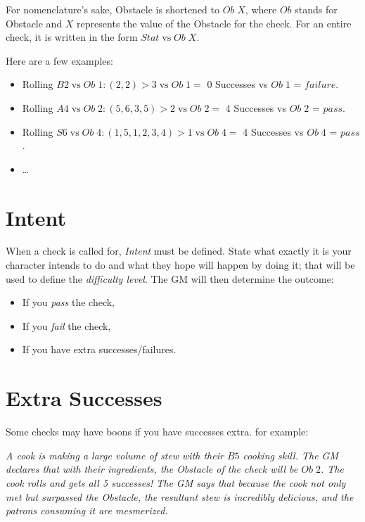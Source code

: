 \documentclass[../main.tex]{subfiles}
\begin{document}
    For nomenclature's sake, Obstacle is shortened to $Ob\; X$, where $Ob$ stands for Obstacle and $X$ represents the value of the Obstacle for the check. For an entire check, it is written in the form $Stat\mathrm{\; vs \;}Ob\; X$.

    Here are a few examples:

    \begin{itemize}
        \item Rolling $B2\mathrm{\; vs \;}Ob\; 1: (2, 2)>3\mathrm{\; vs \;}Ob\; 1 =$ 0 Successes vs $Ob\; 1$ = $failure$.
        \item Rolling $A4\mathrm{\; vs \;}Ob\; 2: (5, 6, 3, 5)>2\mathrm{\; vs \;}Ob\; 2 =$ 4 Successes vs $Ob\; 2$ = $pass$.
        \item Rolling $S6\mathrm{\; vs \;}Ob\; 4: (1, 5, 1, 2, 3, 4)>1\mathrm{\; vs \;}Ob\; 4 =$ 4 Successes vs $Ob\; 4$ = $pass$.
        \item \dots
    \end{itemize}

    \section{Intent}

    When a check is called for, {\em Intent} must be defined. State what exactly it is your character intends to do and what they hope will happen by doing it; that will be used to define the {\em difficulty level}. The GM will then determine the outcome:

    \begin{itemize}
        \item If you {\em pass} the check,
        \item If you {\em fail} the check,
        \item If you have extra successes/failures.
    \end{itemize}

    \section{Extra Successes}

    Some checks may have boons if you have successes extra. for example:

    \begin{displayquote}
        {\em A cook is making a large volume of stew with their $B5$ cooking skill. The GM declares that with their ingredients, the Obstacle of the check will be $Ob\; 2$. The cook rolls and gets all 5 successes! The GM says that because the cook not only met but surpassed the Obstacle, the resultant stew is incredibly delicious, and the patrons consuming it are mesmerized.}
    \end{displayquote}
\end{document}
